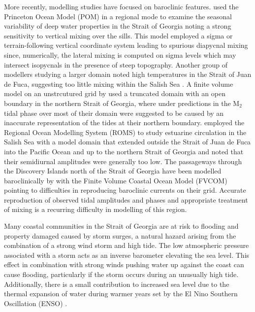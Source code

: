 \documentclass[pdftex,10pt]{article}
\begin{document}
More recently, modelling studies have focused on baroclinic features. \citet{masson2004modelling} used the Princeton Ocean Model (POM) in a regional mode to examine the seasonal variability of deep water properties in the Strait of Georgia noting a strong sensitivity to vertical mixing over the sills. This model employed a sigma or terrain-following vertical coordinate system leading to spurious diapycnal mixing since, numerically, the lateral mixing is computed on sigma levels which may intersect isopycnals in the presence of steep topography. Another group of modellers studying a larger domain noted high temperatures in the Strait of Juan de Fuca, suggesting too little mixing within the Salish Sea \citep{giddings2014hindcasts}. A finite volume model on an unstrcutured grid by \citet{yang2010multi} used a truncated domain with an open boundary in the northern Strait of Georgia, where under predictions in the M$_2$ tidal phase over most of their domain were suggested to be caused by an inaccurate representation of the tides at their northern boundary. \citet{sutherland2011model} employed the Regional Ocean Modelling System (ROMS) to study estuarine circulation in the Salish Sea with a model domain that extended outside the Strait of Juan de Fuca into the Pacific Ocean and up to the northern Strait of Georgia and noted that their semidiurnal amplitudes were generally too low. The passageways through the Discovery Islands north of the Strait of Georgia have been modelled baroclinically by \citet{foreman2012circulation} with the Finite Volume Coastal Ocean Model (FVCOM) pointing to difficulties in reproducing baroclinic currents on their grid.  Accurate reproduction of observed tidal amplitudes and phases and appropriate treatment of mixing is a recurring difficulty in modelling of this region.


Many coastal communities in the Strait of Georgia are at risk to flooding and property damaged caused by storm surges, a natural hazard arising from the combination of a strong wind storm and high tide. The low atmospheric pressure associated with a storm acts as an inverse barometer elevating the sea level. This effect in combination with strong winds pushing water up against the coast can cause flooding, particularly if the storm occurs during an unusually high tide.  Additionally, there is a small contribution to increased sea level due to the thermal expansion of water during warmer years set by the El Nino Southern Oscillation (ENSO) \citep{abeys2011extreme}. %
\end{document}
